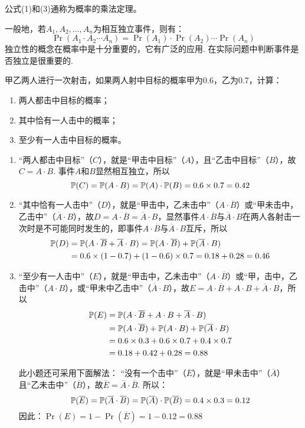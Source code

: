 公式(1)和(3)通称为概率的乘法定理。

一般地，若$A_1,A_2,\ldots,A_n$为相互独立事件，则有：
\begin{equation}
    \Pr(A_1\cdot A_2\cdots A_n)=\Pr(A_1)\cdot \Pr(A_2)\cdots \Pr(A_n)\tag{4}
\end{equation}
独立性的概念在概率中是十分重要的，它有广泛的应用. 在实际问题中判断事件是否独立是很重要的.

\begin{example}
    甲乙两人进行一次射击，如果两人射中目标的概率甲为0.6，乙为0.7，计算：
\begin{enumerate}[(1)]
\item 两人都击中目标的概率；
\item 其中恰有一人击中的概率；
\item 至少有一人击中目标的概率。
\end{enumerate}
\end{example}

\begin{solution}
\begin{enumerate}[(1)]
    \item “两人都击中目标”（$C$），就是“甲击中目标”（$A$），且“乙击中目标”（$B$），故$C=A\cdot B$. 事件$A$和$B$显然相互独立，所以
  \[  \mathbb{P}(C)=\mathbb{P}(A\cdot B)=\mathbb{P}(A)\cdot \mathbb{P}(B)=0.6\times0.7=0.42\]
    \item “其中恰有一人击中”（$D$），就是“甲击中，乙未击中”（$A\cdot \overline{B}$）或“甲未击中，乙击中”（$\overline{A}\cdot B$），故$D=A\cdot \overline{B}=\overline{A}\cdot B$，显然事件$A\cdot \overline{B}$与$\overline{A}\cdot B$在两人各射击一次时是不可能同时发生的，即事件$A\cdot \overline{B}$与$\overline{A}\cdot B$互斥，所以
\[\begin{split}
    \mathbb{P}(D)&=\mathbb{P}(A\cdot \overline{B}+\overline{A}\cdot B)=\mathbb{P}(A\cdot \overline{B})+\mathbb{P}(\overline{A}\cdot B)\\
    &=0.6\times(1-0.7)+(1-0.6)\times 0.7=0.18+0.28=0.46
\end{split}\]
    \item “至少有一人击中”（$E$），就是“甲击中，乙未击中”（$A\cdot \overline{B}$）或“甲，击中，乙击中”（${A}\cdot B$），或“甲未中乙击中”（$\overline{A}\cdot B$），故$E=A\cdot \overline{B}+A\cdot B+\overline{A}\cdot B$，所以
\[\begin{split}
    \mathbb{P}(E) &= \mathbb{P}(A\cdot \overline{B}+A\cdot B+\overline{A}\cdot B)\\
    &=\mathbb{P}(A\cdot \overline{B})+\mathbb{P}(A\cdot B)+\mathbb{P}(\overline{A}\cdot B)\\
    &=0.6\times0.3+0.6\times0.7+0.4\times0.7\\
&=0.18+0.42+0.28=0.88
\end{split}\]

此小题还可采用下面解法：
“没有一个击中”（$\overline{E}$），就是“甲未击中”（$\overline{A}$）且“乙未击中”（$\overline{B}$），故$\overline{E}=\overline{A}\cdot \overline{B}$. 所以：
$$\mathbb{P}(\overline{E})=\mathbb{P}(\overline{A}\cdot \overline{B})=\mathbb{P}(\overline{A})\cdot\mathbb{P}(\overline{B})=0.4\times0.3=0.12$$
因此：$\Pr(E)=1-\Pr(\overline{E})=1-0.12=0.88$
\end{enumerate}
\end{solution}

